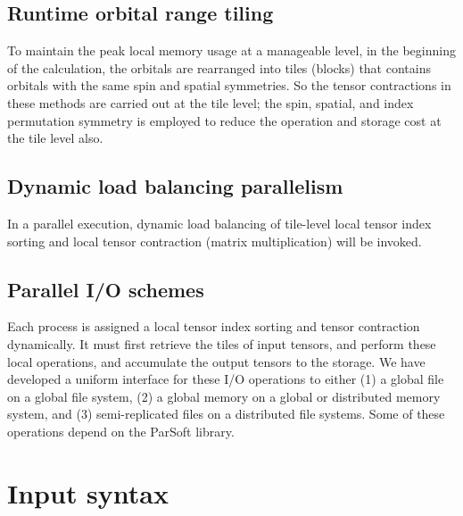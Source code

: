 \subsection{Runtime orbital range tiling}

To maintain the peak local memory usage at a manageable level, in the beginning of the calculation,
the orbitals are rearranged into tiles (blocks) that contains orbitals with the same spin and spatial
symmetries.  So the tensor contractions in these methods are carried out at the tile level; the spin,
spatial, and index permutation symmetry is employed to reduce the operation and storage cost at the tile 
level also.

\subsection{Dynamic load balancing parallelism}

In a parallel execution, dynamic load balancing of tile-level local tensor index sorting and local 
tensor contraction (matrix multiplication) will be invoked.

\subsection{Parallel I/O schemes}

Each process is assigned a local tensor index sorting and tensor contraction dynamically.  It must first
retrieve the tiles of input tensors, and perform these local operations, and accumulate the output
tensors to the storage.  We have developed a uniform interface for these I/O operations to either
(1) a global file on a global file system, (2) a global memory on a global or distributed memory system,
and (3) semi-replicated files on a distributed file systems.  Some of these operations depend on 
the ParSoft library.

\section{Input syntax}
\label{sec:inputsyntax}


